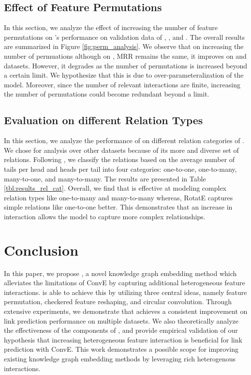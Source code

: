 \documentclass[11pt,a4paper]{article}
\begin{document}
\subsection{Effect of  Feature Permutations}
\label{sec:perm_kernel_results}
In this section, we analyze the effect of increasing the number of feature permutations on \method{}'s performance on validation data of \datafbn{}, \datawnn{}, and \datayago{}. The overall results are summarized in Figure \ref{fig:perm_analysis}. 
We observe that on increasing the number of permuations although on \datafbn{}, MRR remains the same, it improves on \datawnn{} and \datayago{} datasets. However, it degrades as the number of permutations is increased beyond a certain limit. 
We hypothesize that this is due to over-parameteralization of the model. Moreover, since the number of relevant interactions are finite, increasing the number of permutations could become redundant beyond a limit.


\subsection{Evaluation on different Relation Types}
\label{sec:results_rel_cat}
In this section, we analyze the performance of \method{} on different relation categories of \datafbn{}. We chose \datafbn{} for analysis over other datasets because of its more and diverse set of relations. Following \cite{kg_relation_cat}, we classify the relations based on the average number of tails per head and heads per tail into four categories: one-to-one, one-to-many, many-to-one, and many-to-many. The results are presented in Table \ref{tbl:results_rel_cat}. Overall, we find that \method{} is effective at modeling complex relation types like one-to-many and many-to-many whereas, RotatE captures simple relations like one-to-one better. This demonstrates that an increase in interaction allows the model to capture more complex relationships.
 \section{Conclusion}
\label{sec:conclusion}

In this paper, we propose \method{}, a novel knowledge graph embedding method which alleviates the limitations of ConvE by capturing additional heterogeneous feature interactions. \method{} is able to achieve this by utilizing three central ideas, namely feature permutation, checkered feature reshaping, and circular convolution. Through extensive experiments, we demonstrate that \method{} achieves a consistent improvement on link prediction performance on multiple datasets. We also theoretically analyze the effectiveness of the components of \method{}, and provide empirical validation of our hypothesis that increasing heterogeneous feature interaction is beneficial for link prediction with ConvE. This work demonstrates a possible scope for improving existing knowledge graph embedding methods by leveraging rich heterogenous interactions. 


%
 




\end{document}
